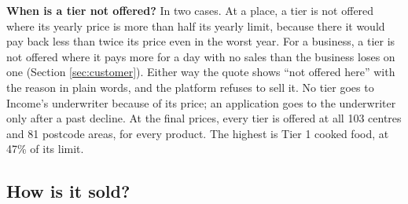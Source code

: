 \documentclass[11pt,a4paper]{article}
\begin{document}
\textbf{When is a tier not offered?} In two cases. At a place, a tier is not offered where its yearly price is more than half its yearly limit, because there it would pay back less than twice its price even in the worst year. For a business, a tier is not offered where it pays more for a day with no sales than the business loses on one (Section \ref{sec:customer}). Either way the quote shows ``not offered here'' with the reason in plain words, and the platform refuses to sell it. No tier goes to Income's underwriter because of its price; an application goes to the underwriter only after a past decline. At the final prices, every tier is offered at all 103 centres and 81 postcode areas, for every product. The highest is Tier 1 cooked food, at 47\% of its limit.

\subsection{How is it sold?}\label{sec:sold}
\end{document}
